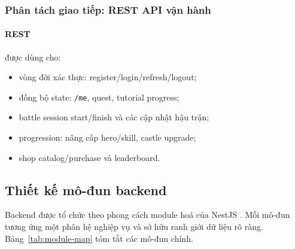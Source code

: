 \subsubsection{Phân tách giao tiếp: REST API vận hành}
\label{subsubsec:design-protocols}

\paragraph{REST} được dùng cho:
\begin{itemize}
    \item vòng đời xác thực: register/\allowbreak login/\allowbreak refresh/\allowbreak logout;
    \item đồng bộ state: \texttt{/me}, quest, tutorial progress;
    \item battle session start/\allowbreak finish và các cập nhật hậu trận;
    \item progression: nâng cấp hero/\allowbreak skill, castle upgrade;
    \item shop catalog/\allowbreak purchase và leaderboard.
\end{itemize}

\subsection{Thiết kế mô-đun backend}
\label{subsec:design-backend-modules}

Backend được tổ chức theo phong cách module hoá của NestJS \cite{nest-docs}. Mỗi mô-đun tương ứng một phân hệ nghiệp vụ và sở hữu ranh giới dữ liệu rõ ràng. Bảng~\ref{tab:module-map} tóm tắt các mô-đun chính.

